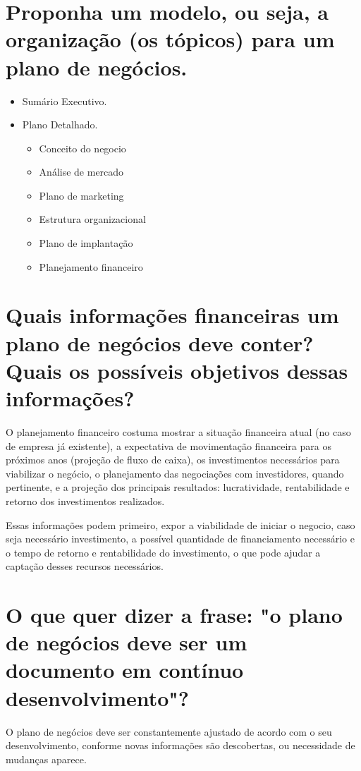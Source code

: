 \documentclass[a4paper,10pt]{article}
\begin{document}
\section{Proponha um modelo, ou seja, a organização (os tópicos) para um plano de negócios.}

\begin{itemize}

\item Sumário Executivo.

\item Plano Detalhado.
\begin{itemize}
\item Conceito do negocio
\item Análise de mercado
\item Plano de marketing
\item Estrutura organizacional
\item Plano de implantação
\item Planejamento financeiro
\end{itemize}
\end{itemize}
\section{Quais informações financeiras um plano de negócios deve conter? Quais os possíveis objetivos dessas informações?}

O planejamento financeiro costuma mostrar a situação financeira atual (no caso de empresa já existente), a expectativa de movimentação financeira para os próximos anos (projeção de fluxo de caixa), os investimentos necessários para viabilizar o negócio, o planejamento das negociações com investidores, quando pertinente, e a projeção dos principais resultados: lucratividade, rentabilidade e retorno dos investimentos realizados.

Essas informações podem primeiro, expor a viabilidade de iniciar o negocio, caso seja necessário investimento, a possível quantidade de financiamento necessário e o tempo de retorno e rentabilidade do investimento, o que pode ajudar a captação desses recursos necessários. 


\section{O que quer dizer a frase: "o plano de negócios deve ser um documento em contínuo desenvolvimento"?}

O plano de negócios deve ser constantemente ajustado de acordo com o seu desenvolvimento, conforme novas informações são descobertas, ou necessidade de mudanças aparece.
\end{document}
